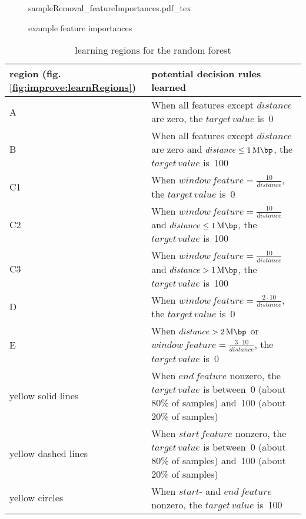 \begin{figure}[p]
 \centering
 \scriptsize
  {sampleRemoval_featureImportances.pdf_tex}
 \caption{example feature importances}
 \label{fig:improve:featureImportance}
\end{figure}

\begin{table}
 \centering
 \begin{tabular}{lL{9cm}}
  \hline
  \textbf{region (fig.\,\ref{fig:improve:learnRegions})} 	& \textbf{potential decision rules learned} \\ \hline
  A		& When all features except $distance$ are zero, the $target\,value$ is~0 \\[1mm]
  B		& When all features except $distance$ are zero and $distance \leq \SI{1}{\mega\bp}$, the $target\,value$ is~100 \\[1mm]
  C1		& When $window\,feature = \frac{10}{distance}$, the $target\,value$ is~0 \\[1mm]
  C2		& When $window\,feature = \frac{10}{distance}$ and $distance \leq \SI{1}{\mega\bp}$, the $target\,value$ is~100 \\[1mm]
  C3		& When $window\,feature = \frac{10}{distance}$ and $distance > \SI{1}{\mega\bp}$, the $target\,value$ is~100 \\[1mm]
  D		& When $window\,feature = \frac{2\cdot10}{distance}$, the $target\,value$  is~0 \\[1mm]
  E		& When $distance > \SI{2}{\mega\bp}$ or $window\,feature = \frac{3\cdot10}{distance}$, the $target\,value$ is~0 \\[1mm]
  yellow solid lines	& When $end\,feature$ nonzero, the $target\,value$ is between~0 (about 80\% of samples) and~100 (about 20\% of samples) \\[1mm]
  yellow dashed lines	& When $start\,feature$ nonzero, the $target\,value$ is between~0 (about 80\% of samples) and~100 (about 20\% of samples) \\[1mm]
  yellow circles	& When $start$- and $end\,feature$ nonzero, the $target\,value$ is~100 \\ \hline
 \end{tabular}
 \caption{learning regions for the random forest}
 \label{tab:improve:learnRegions}
\end{table}

\clearpage
